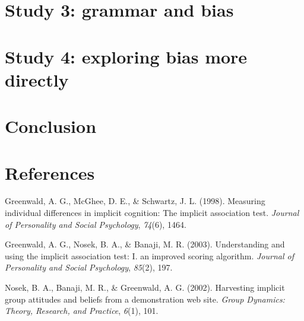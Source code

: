 \documentclass[10pt, letterpaper]{article}
\begin{document}
\section{Study 3: grammar and bias}\label{study-3-grammar-and-bias}

\section{Study 4: exploring bias more
directly}\label{study-4-exploring-bias-more-directly}

\section{Conclusion}\label{conclusion}

\section{References}\label{references}

\setlength{\parindent}{-0.1in} \setlength{\leftskip}{0.125in} \noindent

\hypertarget{refs}{}
\hypertarget{ref-greenwald1998measuring}{}
Greenwald, A. G., McGhee, D. E., \& Schwartz, J. L. (1998). Measuring
individual differences in implicit cognition: The implicit association
test. \emph{Journal of Personality and Social Psychology}, \emph{74}(6),
1464.

\hypertarget{ref-greenwald2003understanding}{}
Greenwald, A. G., Nosek, B. A., \& Banaji, M. R. (2003). Understanding
and using the implicit association test: I. an improved scoring
algorithm. \emph{Journal of Personality and Social Psychology},
\emph{85}(2), 197.

\hypertarget{ref-nosek2002harvesting}{}
Nosek, B. A., Banaji, M. R., \& Greenwald, A. G. (2002). Harvesting
implicit group attitudes and beliefs from a demonstration web site.
\emph{Group Dynamics: Theory, Research, and Practice}, \emph{6}(1), 101.
\end{document}
